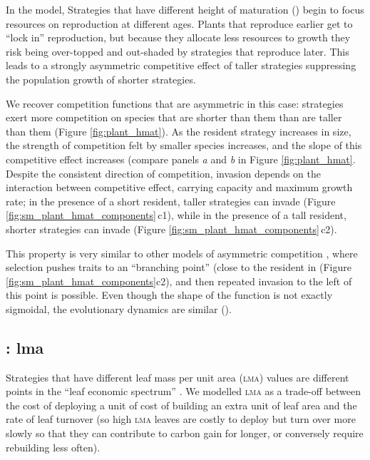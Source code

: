 \documentclass[a4paper,11pt]{article}
\begin{document}
In the \plant model, Strategies that have different height of
maturation (\hmat) begin to focus resources on reproduction at
different ages.  Plants that reproduce earlier get to ``lock in''
reproduction, but because they allocate less resources to growth they
risk being over-topped and out-shaded by strategies that reproduce
later.  This leads to a strongly asymmetric competitive effect of
taller strategies suppressing the population growth of shorter
strategies.

We recover competition functions that are asymmetric in this case:
strategies exert more competition on species that are shorter than
them than are taller than them (Figure \ref{fig:plant_hmat}).  As the
resident strategy increases in size, the strength of competition felt
by smaller species increases, and the slope of this competitive effect
increases (compare panels \textit{a} and \textit{b} in Figure
\ref{fig:plant_hmat}.
%
Despite the consistent direction of competition, invasion depends on
the interaction between competitive effect, carrying capacity and
maximum growth rate; in the presence of a short resident, taller
strategies can invade (Figure \ref{fig:sm_plant_hmat_components}\,c1),
while in the presence of a tall resident, shorter strategies can
invade (Figure \ref{fig:sm_plant_hmat_components}\,c2).

This property is very similar to other models of asymmetric
competition \citep[e.g.,][]{Kisdi-1999}, where selection pushes traits
to an ``branching point'' (close to the resident in (Figure
\ref{fig:sm_plant_hmat_components}c2), and then repeated invasion to
the left of this point is possible.
Even though the shape of the function is not exactly sigmoidal, the
evolutionary dynamics are similar (\TODO).

\subsection{\plant: lma}
Strategies that have different leaf mass per unit area (\textsc{lma})
values are different points in the ``leaf economic spectrum''
\citep{Reich-1997,Wright-2004}.  We modelled \textsc{lma} as a trade-off
between the cost of deploying a unit of cost of building an extra unit
of leaf area and the rate of leaf turnover (so high \textsc{lma} leaves are
costly to deploy but turn over more slowly so that they can contribute
to carbon gain for longer, or conversely require rebuilding less
often).
\end{document}
